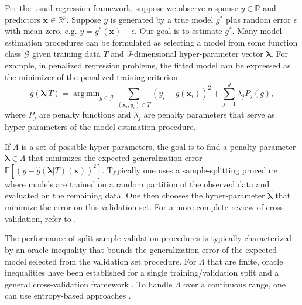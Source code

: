 \documentclass[12pt]{article} %
\theoremstyle{definition}
\DeclareMathOperator*{\argmin}{arg\,min}
\begin{document}
Per the usual regression framework, suppose we observe response $y \in \mathbb{R}$ and predictors $\boldsymbol {x} \in \mathbb{R}^p$. Suppose $y$ is generated by a true model $g^*$ plus random error $\epsilon$ with mean zero, e.g.
$y = g^*(\boldsymbol x) + \epsilon$.
Our goal is to estimate $g^*$.
Many model-estimation procedures can be formulated as selecting a model from some function class $\mathcal{G}$ given training data $T$ and $J$-dimensional hyper-parameter vector $\boldsymbol{\lambda}$. For example, in penalized regression problems, the fitted model can be expressed as the minimizer of the penalized training criterion
\begin{equation}
\label{eq:intro_pen_reg}
\hat{g}(\boldsymbol \lambda | T) = \argmin_{g\in \mathcal{G}} \sum_{(\boldsymbol{x}_i, y_i) \in T} \left (y_i -  g(\boldsymbol{x}_i) \right )^2 + \sum_{j=1}^J \lambda_j P_j(g),
\end{equation}
where $P_j$ are penalty functions and $\lambda_j$ are penalty parameters that serve as hyper-parameters of the model-estimation procedure.

If $\Lambda$ is a set of possible hyper-parameters, the goal is to find a penalty parameter $\boldsymbol{\lambda} \in \Lambda$ that minimizes the expected generalization error
$
\mathbb{E} \left [
\left ( y - \hat{g}(\boldsymbol{\lambda} | T)(\boldsymbol{x}) \right )^2
\right ].
$
Typically one uses a sample-splitting procedure where models are trained on a random partition of the observed data and evaluated on the remaining data.
One then chooses the hyper-parameter $\hat{\boldsymbol{\lambda}}$ that minimize the error on this validation set.
For a more complete review of cross-validation, refer to \citet{arlot2010survey}.

The performance of split-sample validation procedures is typically characterized by an oracle inequality that bounds the generalization error of the expected model selected from the validation set procedure. For $\Lambda$ that are finite, oracle inequalities have been established for a single training/validation split \citep{gyorfi2006distribution} and a general cross-validation framework \citep{van2003unified, van2004asymptotic}. To handle $\Lambda$ over a continuous range, one can use entropy-based approaches \citep{lecue2012oracle}.
\end{document}
